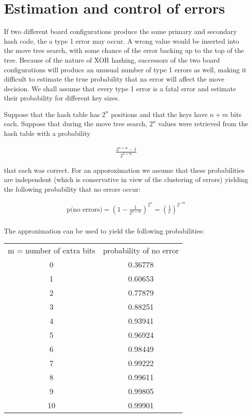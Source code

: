 \documentclass{article}
\begin{document}
\section*{Estimation and control of errors}

If two different board configurations produce the same primary and secondary
hash code, the a type 1 error may occur. A wrong value would be inserted into
the move tree search, with some chance of the error backing up to the top of
the tree. Because of the nature of XOR hashing, successors of the two board
configurations will produce an unusual number of type 1 errors as well, making
it difficult to estimate the true probability that na error will affect the
move decision. We shall assume that every type 1 error is a fatal error and
estimate their probability for different key sizes.

Suppose that the hash table has $2^n$ positions and that the keys have $n + m$ bits each. Suppose that during the move tree search, $2^n$ values were retrieved from the hash table with a probability

\begin{align*}
\frac{2^{n + m} - 1}{2^{n+m}}
\end{align*}

that each was correct. For an apporoximation we assume that these probabilities are independent (which is conservative in view of the clustering of errors) yielding the following probability that no errors occur:

\begin{align*}
\text{p(no errors)} = (1 - \frac{1}{2^{n+m}})^{2^n} = (\frac{1}{e})^{2^{-m}} \\
\end{align*}

The approximation can be used to yield the following probabilities:

\begin{center}
\begin{tabular}{c c}
m = number of extra bits & probability of no error \\
0 & 0.36778 \\
1 & 0.60653 \\
2 & 0.77879 \\
3 & 0.88251 \\
4 & 0.93941 \\
5 & 0.96924 \\
6 & 0.98449 \\
7 & 0.99222 \\
8 & 0.99611 \\
9 & 0.99805 \\
10& 0.99901 \\
\end{tabular}
\end{center}
\end{document}
